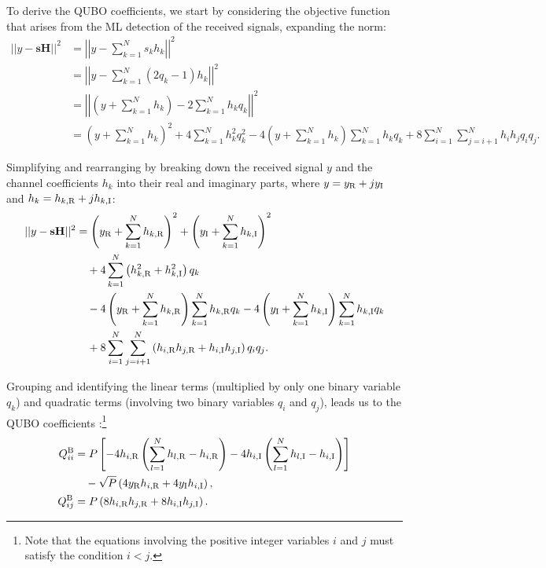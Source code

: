 To derive the QUBO coefficients, we start by considering the objective function that arises from the ML detection of the received signals\cite{Kizilirmak2020}, expanding the norm:
\vspace{-0.1cm}
\begin{align}
||y - \mathbf{s H}||^2 &= \left| \left|y - \sum_{k=1}^{N} s_k h_k\right| \right|^2 \nonumber \\
&= \left| \left| y - \sum_{k=1}^{N} (2q_k - 1) h_k\right| \right|^2 \nonumber \\
&= \left| \left| \left(y + \sum_{k=1}^{N} h_k\right) - 2 \sum_{k=1}^{N} h_k q_k\right| \right| ^2 \nonumber \\
&= \left(y + \sum_{k=1}^{N} h_k\right)^2 + 4 \sum_{k=1}^{N} h_k^2 q_k^2 - 4\left(y + \sum_{k=1}^{N} h_k\right) \sum_{k=1}^{N} h_k q_k + 8 \sum_{i=1}^{N} \sum_{j=i+1}^{N} h_i h_j q_i q_j.
\end{align}

Simplifying and rearranging by breaking down the received signal \(y\) and the channel coefficients \(h_k\) into their real and imaginary parts, where \(y = y_{\rm R} + jy_{\rm I}\) and \(h_k = h_{k,{\rm R}} + jh_{k,{\rm I}}\):
\vspace{-0.05cm}
\begin{align}
||y - \mathbf{s H}||^2 &= \left(y_{\rm R} + \sum_{k=1}^{N} h_{k,{\rm R}}\right)^2 + \left(y_{\rm I} + \sum_{k=1}^{N} h_{k,{\rm I}}\right)^2 \nonumber \\
&\quad + 4 \sum_{k=1}^{N} \left(h_{k,{\rm R}}^2 + h_{k,{\rm I}}^2\right) q_k \nonumber \\
&\quad - 4\left(y_{\rm R} + \sum_{k=1}^{N} h_{k,{\rm R}}\right) \sum_{k=1}^{N} h_{k,{\rm R}} q_k - 4\left(y_{\rm I} + \sum_{k=1}^{N} h_{k,{\rm I}}\right) \sum_{k=1}^{N} h_{k,{\rm I}} q_k \nonumber \\
&\quad + 8 \sum_{i=1}^{N} \sum_{j=i+1}^{N} \left(h_{i,{\rm R}} h_{j,{\rm R}} + h_{i,{\rm I}} h_{j,{\rm I}}\right) q_i q_j.
\end{align}

Grouping and identifying the linear terms (multiplied by only one binary variable \( q_k \)) and quadratic terms (involving two binary variables \( q_i \) and \( q_j \)), leads us to the QUBO coefficients \cite{Gabdulsattarov2023}:\footnote{Note that the equations involving the positive integer variables \(i\) and \(j\) must satisfy the condition \(i < j\).}
\begin{align}
Q_{ii}^{\rm B} &= P \left[ -4 h_{i,{\rm R}} \left( \sum_{l=1}^{N} h_{l,{\rm R}} - h_{i,{\rm R}} \right) - 4 h_{i,{\rm I}} \left( \sum_{l=1}^{N} h_{l,{\rm I}} - h_{i,{\rm I}} \right) \right] \nonumber \\
&\quad - \sqrt{P} \left( 4 y_{\rm R} h_{i,{\rm R}} + 4 y_{\rm I} h_{i,{\rm I}} \right), \\
Q_{ij}^{\rm B} &= P \left( 8 h_{i,{\rm R}} h_{j,{\rm R}} + 8 h_{i,{\rm I}} h_{j,{\rm I}} \right).
\end{align}
